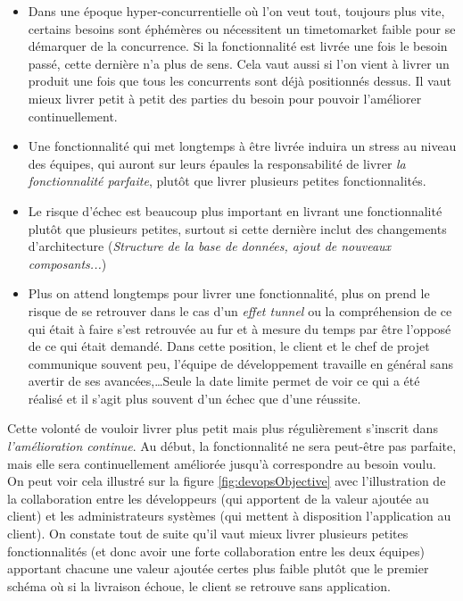 \begin{itemize}
	\setlength\itemsep{0em}
	\item Dans une époque hyper-concurrentielle où l'on veut tout, toujours plus vite, certains besoins sont éphémères ou nécessitent un \gls{timetomarket} faible pour se démarquer de la concurrence. Si la fonctionnalité est livrée une fois le besoin passé, cette dernière n'a plus de sens. Cela vaut aussi si l'on vient à livrer un produit une fois que tous les concurrents sont déjà positionnés dessus. Il vaut mieux livrer petit à petit des parties du besoin pour pouvoir l'améliorer continuellement.
	\item Une fonctionnalité qui met longtemps à être livrée induira un stress au niveau des équipes, qui auront sur leurs épaules la responsabilité de livrer \emph{la fonctionnalité parfaite}, plutôt que livrer plusieurs petites fonctionnalités.
	\item Le risque d'échec est beaucoup plus important en livrant une fonctionnalité plutôt que plusieurs petites, surtout si cette dernière inclut des changements d'architecture (\emph{Structure de la base de données, ajout de nouveaux composants...})
	\item Plus on attend longtemps pour livrer une fonctionnalité, plus on prend le risque de se retrouver dans le cas d'un \emph{effet tunnel} ou la compréhension de ce qui était à faire s'est retrouvée au fur et à mesure du temps par être l'opposé de ce qui était demandé. Dans cette position, le client et le chef de projet communique souvent peu, l'équipe de développement travaille en général sans avertir de ses avancées,\ldots Seule la date limite permet de voir ce qui a été réalisé et il s'agit plus souvent d'un échec que d'une réussite.
\end{itemize}

Cette volonté de vouloir livrer plus petit mais plus régulièrement s'inscrit dans \emph{l'amélioration continue}. Au début, la fonctionnalité ne sera peut-être pas parfaite, mais elle sera continuellement améliorée jusqu'à correspondre au besoin voulu. On peut voir cela illustré sur la figure \ref{fig:devopsObjective} avec l'illustration de la collaboration entre les développeurs (qui apportent de la valeur ajoutée au client) et les administrateurs systèmes (qui mettent à disposition l'application au client). On constate tout de suite qu'il vaut mieux livrer plusieurs petites fonctionnalités (et donc avoir une forte collaboration entre les deux équipes) apportant chacune une valeur ajoutée certes plus faible plutôt que le premier schéma où si la livraison échoue, le client se retrouve sans application.

